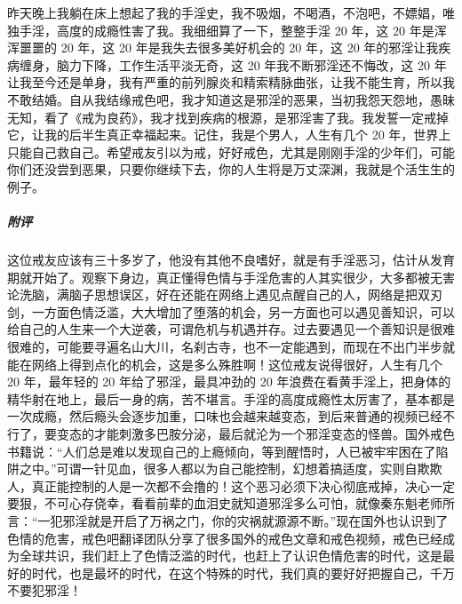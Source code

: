 \begin{case}
    昨天晚上我躺在床上想起了我的手淫史，我不吸烟，不喝酒，不泡吧，不嫖娼，唯独手淫，高度的成瘾性害了我。我细细算了一下，整整手淫 20 年，这 20 年是浑浑噩噩的 20 年，这 20 年是我失去很多美好机会的 20 年，这 20 年的邪淫让我疾病缠身，脑力下降，工作生活平淡无奇，这 20 年我不断邪淫还不悔改，这 20 年让我至今还是单身，我有严重的前列腺炎和精索精脉曲张，让我不能生育，所以我不敢结婚。自从我结缘戒色吧，我才知道这是邪淫的恶果，当初我怨天怨地，愚昧无知，看了《戒为良药》，我才找到疾病的根源，是邪淫害了我。我发誓一定戒掉它，让我的后半生真正幸福起来。记住，我是个男人，人生有几个 20 年，世界上只能自己救自己。希望戒友引以为戒，好好戒色，尤其是刚刚手淫的少年们，可能你们还没尝到恶果，只要你继续下去，你的人生将是万丈深渊，我就是个活生生的例子。
    \subparagraph{附评} 这位戒友应该有三十多岁了，他没有其他不良嗜好，就是有手淫恶习，估计从发育期就开始了。观察下身边，真正懂得色情与手淫危害的人其实很少，大多都被无害论洗脑，满脑子思想误区，好在还能在网络上遇见点醒自己的人，网络是把双刃剑，一方面色情泛滥，大大增加了堕落的机会，另一方面也可以遇见善知识，可以给自己的人生来一个大逆袭，可谓危机与机遇并存。过去要遇见一个善知识是很难很难的，可能要寻遍名山大川，名刹古寺，也不一定能遇到，而现在不出门半步就能在网络上得到点化的机会，这是多么殊胜啊！这位戒友说得很好，人生有几个 20 年，最年轻的 20 年给了邪淫，最具冲劲的 20 年浪费在看黄手淫上，把身体的精华射在地上，最后一身的病，苦不堪言。手淫的高度成瘾性太厉害了，基本都是一次成瘾，然后瘾头会逐步加重，口味也会越来越变态，到后来普通的视频已经不行了，要变态的才能刺激多巴胺分泌，最后就沦为一个邪淫变态的怪兽。国外戒色书籍说：“人们总是难以发现自己的上瘾倾向，等到醒悟时，人已被牢牢困在了陷阱之中。”可谓一针见血，很多人都以为自己能控制，幻想着搞适度，实则自欺欺人，真正能控制的人是一次都不会撸的！这个恶习必须下决心彻底戒掉，决心一定要狠，不可心存侥幸，看看前辈的血泪史就知道邪淫多么可怕，就像秦东魁老师所言：“一犯邪淫就是开启了万祸之门，你的灾祸就源源不断。”现在国外也认识到了色情的危害，戒色吧翻译团队分享了很多国外的戒色文章和戒色视频，戒色已经成为全球共识，我们赶上了色情泛滥的时代，也赶上了认识色情危害的时代，这是最好的时代，也是最坏的时代，在这个特殊的时代，我们真的要好好把握自己，千万不要犯邪淫！
\end{case}

